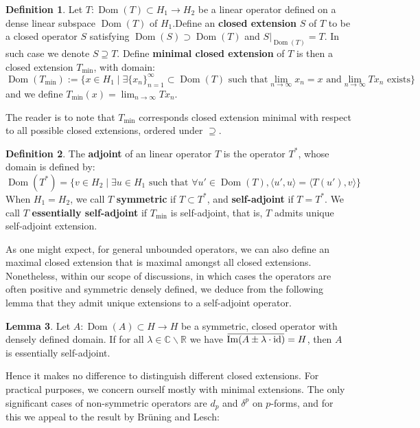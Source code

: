 \documentclass[11pt]{report}
\theoremstyle{definition}
\newtheorem{Def}{Definition}[chapter]
\newtheorem{Lemma}[Def]{Lemma}
\theoremstyle{plain}
\DeclareMathOperator{\id}{id}
\DeclareMathOperator{\im}{Im}
\DeclareMathOperator{\dom}{Dom}
\newcommand{\real}{\mathbb{R}}
\newcommand{\complex}{\mathbb{C}}
\newcommand{\overbar}[1]{\mkern 1.5mu\overline{\mkern-1.5mu#1\mkern-1.5mu}\mkern 1.5mu}
\newcommand{\brac}[1]{\langle #1 \rangle}
\renewcommand{\bar}{\overbar}
\begin{document}
\begin{Def}
	Let $T:\dom(T)\subset H_1\to H_2$ be a linear operator defined on a dense linear subspace $\dom(T)$ of $H_1$.Define an \textbf{closed extension} $S$ of $T$ to be a closed operator $S$ satisfying $\dom(S)\supset \dom(T)$ and $S|_{\dom(T)}=T$. In such case we denote $S\supseteq T$. 
Define  \textbf{minimal closed extension} of $T$ is then a closed extension $T_{\min}$, with domain:
	\begin{equation}
	\dom(T_{\min}):=\{x\in H_1\mid \exists \{x_n\}_{n=1}^\infty\subset \dom(T) \text{ such that}\lim_{n\to \infty}x_n=x \text{ and} \lim_{n\to \infty}Tx_n \text{ exists}\}
	\end{equation}
	and we define $T_{\min}(x)=\lim_{n\to \infty}Tx_n$.
\end{Def}
The reader is to note that $T_{\min}$ corresponds closed extension minimal with respect to all possible closed extensions, ordered under $\supseteq$. 
\begin{Def}
The \textbf{adjoint} of an linear operator $T$ is the operator $T^*$, whose domain is defined by:
\begin{equation}
\dom(T^*)=\Big\{v\in H_2\mid \exists u\in H_1 \text{ such that } \forall u'\in \dom(T), \brac{u', u}=\brac{T(u'),v}\Big\}
\end{equation}
When $H_1=H_2$, we call $T$ \textbf{symmetric} if $T\subset T^*$, and \textbf{self-adjoint} if $T=T^*$. We call $T$ \textbf{essentially self-adjoint} if $T_{\min}$ is self-adjoint, that is, $T$ admits unique self-adjoint extension.
\end{Def}
As one might expect, for general unbounded operators, we can also define an maximal closed extension that is maximal amongst all closed extensions. Nonetheless, within our scope of discussions, in which cases the operators are often positive and symmetric densely defined, we deduce from the following lemma that they admit unique extensions to a self-adjoint operator. 
\begin{Lemma}\label{langa1}
	\cite[A2, \S 1]{lang2012} Let $A:\dom(A)\subset H\to H$ be a symmetric, closed operator with densely defined domain. If for all $\lambda\in \complex\backslash \real$ we have $\bar{\im (A\pm \lambda\cdot \id)}=H$, then $A$ is essentially self-adjoint.
\end{Lemma}
Hence it makes no difference to distinguish different closed extensions. For practical purposes, we concern ourself mostly with minimal extensions. The only significant cases of non-symmetric operators are $d_p$ and $\delta^p$ on $p$-forms, and for this we appeal to the result by Br\"uning and Lesch:
\end{document}
